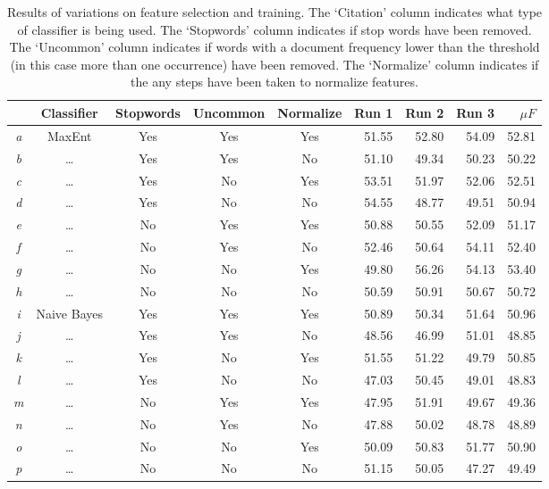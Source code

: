 \documentclass[final,3p,12pt]{elsarticle}
\begin{document}
\begin{table}[H]
    \begin{center}
    \begin{tabular}{|c||c|c|c|c|r|r|r|r|}
        \hline
                   & Classifier  & Stopwords & Uncommon  & Normalize & Run 1 & Run 2 & Run 3 & $\mu F$\\
        \hline
        \textit{a} & MaxEnt      & Yes       & Yes       & Yes       & 51.55 & 52.80 & 54.09 & 52.81 \\
        \textit{b} & \dots       & Yes       & Yes       & No        & 51.10 & 49.34 & 50.23 & 50.22 \\
        \textit{c} & \dots       & Yes       & No        & Yes       & 53.51 & 51.97 & 52.06 & 52.51 \\
        \textit{d} & \dots       & Yes       & No        & No        & 54.55 & 48.77 & 49.51 & 50.94 \\
        \textit{e} & \dots       & No        & Yes       & Yes       & 50.88 & 50.55 & 52.09 & 51.17 \\
        \textit{f} & \dots       & No        & Yes       & No        & 52.46 & 50.64 & 54.11 & 52.40 \\
        \textit{g} & \dots       & No        & No        & Yes       & 49.80 & 56.26 & 54.13 & 53.40 \\
        \textit{h} & \dots       & No        & No        & No        & 50.59 & 50.91 & 50.67 & 50.72 \\
        \textit{i} & Naive Bayes & Yes       & Yes       & Yes       & 50.89 & 50.34 & 51.64 & 50.96 \\
        \textit{j} & \dots       & Yes       & Yes       & No        & 48.56 & 46.99 & 51.01 & 48.85 \\
        \textit{k} & \dots       & Yes       & No        & Yes       & 51.55 & 51.22 & 49.79 & 50.85 \\
        \textit{l} & \dots       & Yes       & No        & No        & 47.03 & 50.45 & 49.01 & 48.83 \\
        \textit{m} & \dots       & No        & Yes       & Yes       & 47.95 & 51.91 & 49.67 & 49.36 \\
        \textit{n} & \dots       & No        & Yes       & No        & 47.88 & 50.02 & 48.78 & 48.89 \\
        \textit{o} & \dots       & No        & No        & Yes       & 50.09 & 50.83 & 51.77 & 50.90 \\
        \textit{p} & \dots       & No        & No        & No        & 51.15 & 50.05 & 47.27 & 49.49 \\
        \hline
    \end{tabular}
    \end{center}
    \caption{Results of variations on feature selection and training. The
    `Citation' column indicates what type of classifier is being used. The
    `Stopwords' column indicates if stop words have been removed. The `Uncommon'
    column indicates if words with a document frequency lower than the threshold
    (in this case more than one occurrence) have been removed. The `Normalize'
    column indicates if the any steps have been taken to normalize features.}
    \label{table:results}
\end{table}
\end{document}
